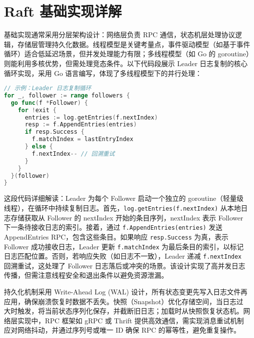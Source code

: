 \chapter{Raft 基础实现详解}
基础实现通常采用分层架构设计：网络层负责 RPC 通信，状态机层处理协议逻辑，存储层管理持久化数据。线程模型是关键考量点，事件驱动模型（如基于事件循环）适合低延迟场景，但并发处理能力有限；多线程模型（如 Go 的 goroutine）则能利用多核优势，但需处理竞态条件。以下代码段展示 Leader 日志复制的核心循环实现，采用 Go 语言编写，体现了多线程模型下的并行处理：\par
\begin{lstlisting}[language=go]
// 示例：Leader 日志复制循环
for _, follower := range followers {
  go func(f *Follower) {
    for !exit {
      entries := log.getEntries(f.nextIndex)
      resp := f.AppendEntries(entries)
      if resp.Success {
        f.matchIndex = lastEntryIndex
      } else {
        f.nextIndex-- // 回溯重试
      }
    }
  }(follower)
}
\end{lstlisting}
这段代码详细解读：Leader 为每个 Follower 启动一个独立的 goroutine（轻量级线程），在循环中持续复制日志。首先，\texttt{log.getEntries(f.nextIndex)} 从本地日志存储获取从 Follower 的 nextIndex 开始的条目序列，nextIndex 表示 Follower 下一条待接收日志的索引。接着，通过 \texttt{f.AppendEntries(entries)} 发送 AppendEntries RPC，包含这些条目。如果响应 \texttt{resp.Success} 为真，表示 Follower 成功接收日志，Leader 更新 \texttt{f.matchIndex} 为最后条目的索引，以标记日志匹配位置。否则，若响应失败（如日志不一致），Leader 递减 \texttt{f.nextIndex} 回溯重试，这处理了 Follower 日志落后或冲突的场景。该设计实现了高并发日志传播，但需注意线程安全和退出条件以避免资源泄漏。\par
持久化机制采用 Write-Ahead Log (WAL) 设计，所有状态变更先写入日志文件再应用，确保崩溃恢复时数据不丢失。快照（Snapshot）优化存储空间，当日志过大时触发，将当前状态序列化保存，并截断旧日志；加载时从快照恢复状态机。网络层实现中，RPC 框架如 gRPC 或 Thrift 提供高效通信，需实现消息重试机制应对网络抖动，并通过序列号或唯一 ID 确保 RPC 的幂等性，避免重复操作。\par
